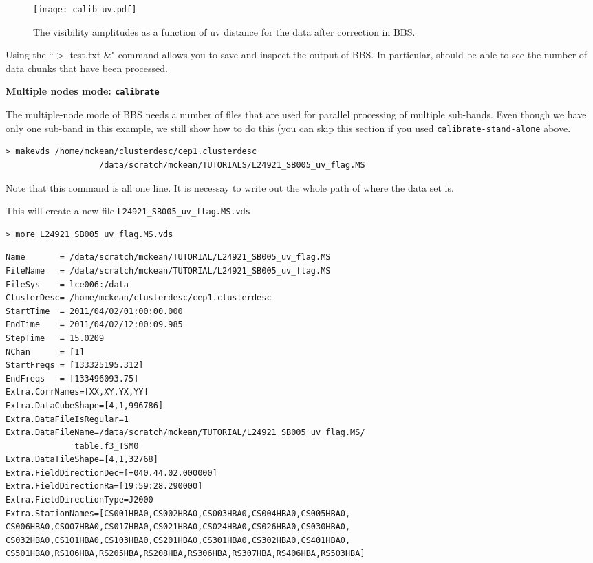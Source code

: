 \begin{figure*}[!hb]
\begin{center}
    \texttt{[image: calib-uv.pdf]}
  \caption{The visibility amplitudes as a function of uv distance for the data after correction in BBS.}
  \label{ex:calib2}
  \end{center}
\end{figure*}

Using the ``$>$ test.txt \&" command allows you to save and inspect the output of BBS. In particular, should be able to see the number of data chunks that have been processed.

\textbf{Multiple nodes mode: \texttt{calibrate}}

The multiple-node mode of BBS needs a number of files that are used for parallel processing of multiple sub-bands. Even though we have only one sub-band in this example, we still show how to do this (you can skip this section if you used \texttt{calibrate-stand-alone} above.

\begin{verbatim}
> makevds /home/mckean/clusterdesc/cep1.clusterdesc 
                   /data/scratch/mckean/TUTORIALS/L24921_SB005_uv_flag.MS
\end{verbatim}

Note that this command is all one line. It is necessay to write out the whole path of where the data set is.

This will create a new file \texttt{L24921\_SB005\_uv\_flag.MS.vds}

\begin{verbatim}
> more L24921_SB005_uv_flag.MS.vds
\end{verbatim}
\begin{lstlisting}
Name       = /data/scratch/mckean/TUTORIAL/L24921_SB005_uv_flag.MS
FileName   = /data/scratch/mckean/TUTORIAL/L24921_SB005_uv_flag.MS
FileSys    = lce006:/data
ClusterDesc= /home/mckean/clusterdesc/cep1.clusterdesc
StartTime  = 2011/04/02/01:00:00.000
EndTime    = 2011/04/02/12:00:09.985
StepTime   = 15.0209
NChan      = [1]
StartFreqs = [133325195.312]
EndFreqs   = [133496093.75]
Extra.CorrNames=[XX,XY,YX,YY]
Extra.DataCubeShape=[4,1,996786]
Extra.DataFileIsRegular=1
Extra.DataFileName=/data/scratch/mckean/TUTORIAL/L24921_SB005_uv_flag.MS/
		      table.f3_TSM0
Extra.DataTileShape=[4,1,32768]
Extra.FieldDirectionDec=[+040.44.02.000000]
Extra.FieldDirectionRa=[19:59:28.290000]
Extra.FieldDirectionType=J2000
Extra.StationNames=[CS001HBA0,CS002HBA0,CS003HBA0,CS004HBA0,CS005HBA0,
CS006HBA0,CS007HBA0,CS017HBA0,CS021HBA0,CS024HBA0,CS026HBA0,CS030HBA0,
CS032HBA0,CS101HBA0,CS103HBA0,CS201HBA0,CS301HBA0,CS302HBA0,CS401HBA0,
CS501HBA0,RS106HBA,RS205HBA,RS208HBA,RS306HBA,RS307HBA,RS406HBA,RS503HBA]
\end{lstlisting}

